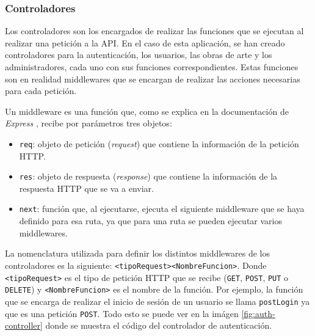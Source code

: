 \subsubsection{Controladores}
Los controladores son los encargados de realizar las funciones que se ejecutan al
realizar una petición a la API. En el caso de esta aplicación, se han creado
controladores para la autenticación, los usuarios, las obras de arte y los administradores,
cada uno con sus funciones correspondientes. Estas funciones son en realidad middlewares
que se encargan de realizar las acciones necesarias para cada petición.

Un middleware es una función que, como se explica en la documentación de \textit{Express}
\cite{express-middleware}, recibe por parámetros tres objetos:

\begin{itemize}
  \item \texttt{req}: objeto de petición (\textit{request}) que contiene la información
  de la petición HTTP.
  \item \texttt{res}: objeto de respuesta (\textit{response}) que contiene la información
  de la respuesta HTTP que se va a enviar.
  \item \texttt{next}: función que, al ejecutarse, ejecuta el siguiente middleware que se
  haya definido para esa ruta, ya que para una ruta se pueden ejecutar varios middlewares.
\end{itemize}

La nomenclatura utilizada para definir los distintos middlewares de los controladores es
la siguiente: \texttt{<tipoRequest><NombreFuncion>}. Donde \texttt{<tipoRequest>} es el
tipo de petición HTTP que se recibe (\texttt{GET}, \texttt{POST}, \texttt{PUT} o
\texttt{DELETE}) y \texttt{<NombreFuncion>} es el nombre de la función. Por ejemplo,
la función que se encarga de realizar el inicio de sesión de un usuario se llama
\texttt{postLogin} ya que es una petición \texttt{POST}. Todo esto se puede ver en la
imágen \ref{fig:auth-controller} donde se muestra el código del controlador de
autenticación.

